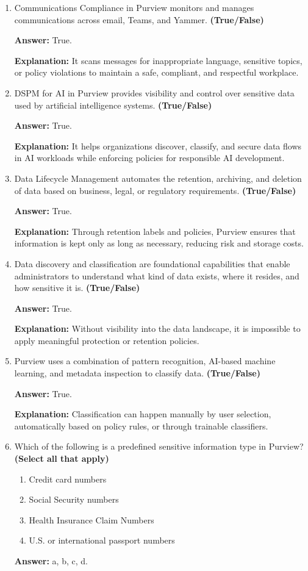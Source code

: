 \documentclass[10pt]{article}
\begin{document}
\begin{enumerate}[leftmargin=*]
\item Communications Compliance in Purview monitors and manages communications across email, Teams, and Yammer. \textbf{(True/False)}

\textbf{Answer:} True.

\textbf{Explanation:} It scans messages for inappropriate language, sensitive topics, or policy violations to maintain a safe, compliant, and respectful workplace.

\item DSPM for AI in Purview provides visibility and control over sensitive data used by artificial intelligence systems. \textbf{(True/False)}

\textbf{Answer:} True.

\textbf{Explanation:} It helps organizations discover, classify, and secure data flows in AI workloads while enforcing policies for responsible AI development.

\item Data Lifecycle Management automates the retention, archiving, and deletion of data based on business, legal, or regulatory requirements. \textbf{(True/False)}

\textbf{Answer:} True.

\textbf{Explanation:} Through retention labels and policies, Purview ensures that information is kept only as long as necessary, reducing risk and storage costs.

\item Data discovery and classification are foundational capabilities that enable administrators to understand what kind of data exists, where it resides, and how sensitive it is. \textbf{(True/False)}

\textbf{Answer:} True.

\textbf{Explanation:} Without visibility into the data landscape, it is impossible to apply meaningful protection or retention policies.

\item Purview uses a combination of pattern recognition, AI-based machine learning, and metadata inspection to classify data. \textbf{(True/False)}

\textbf{Answer:} True.

\textbf{Explanation:} Classification can happen manually by user selection, automatically based on policy rules, or through trainable classifiers.

\item Which of the following is a predefined sensitive information type in Purview? \textbf{(Select all that apply)}
\begin{enumerate}[label=\alph*., leftmargin=1.5em]
\item Credit card numbers
\item Social Security numbers
\item Health Insurance Claim Numbers
\item U.S. or international passport numbers
\end{enumerate}
\textbf{Answer:} a, b, c, d.


\end{enumerate}
\end{document}
